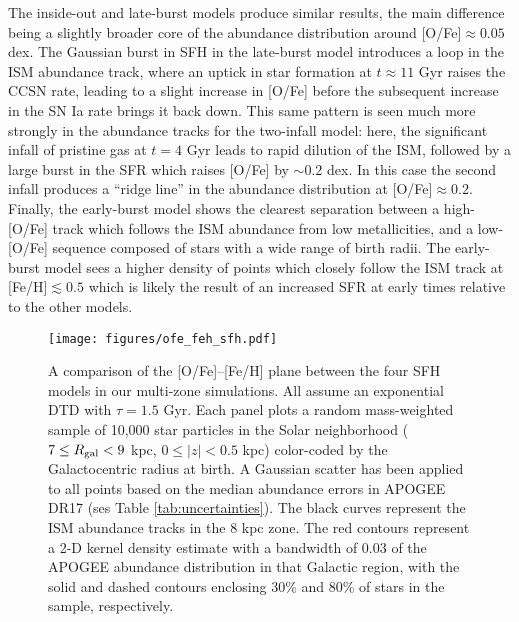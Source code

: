\documentclass[modern,linenumbers]{aastex631}
\begin{document}
The inside-out and late-burst models produce similar results, the main difference being a slightly broader core of the abundance distribution around [O/Fe]$\approx0.05$ dex. The Gaussian burst in SFH in the late-burst model introduces a loop in the ISM abundance track, where an uptick in star formation at $t\approx11$ Gyr raises the CCSN rate, leading to a slight increase in [O/Fe] before the subsequent increase in the SN Ia rate brings it back down. This same pattern is seen much more strongly in the abundance tracks for the two-infall model: here, the significant infall of pristine gas at $t=4$ Gyr leads to rapid dilution of the ISM, followed by a large burst in the SFR which raises [O/Fe] by $\sim 0.2$ dex. In this case the second infall produces a ``ridge line'' in the abundance distribution at [O/Fe]$\approx 0.2$. Finally, the early-burst model shows the clearest separation between a high-[O/Fe] track which follows the ISM abundance from low metallicities, and a low-[O/Fe] sequence composed of stars with a wide range of birth radii. The early-burst model sees a higher density of points which closely follow the ISM track at [Fe/H]$\lesssim 0.5$ which is likely the result of an increased SFR at early times relative to the other models.

\begin{figure}
    \centering
    \texttt{[image: figures/ofe\_feh\_sfh.pdf]}
    \caption{A comparison of the [O/Fe]--[Fe/H] plane between the four SFH models in our multi-zone simulations. All assume an exponential DTD with $\tau=1.5$ Gyr. Each panel plots a random mass-weighted sample of 10,000 star particles in the Solar neighborhood ($7\leq R_{\rm gal}<9$ kpc, $0\leq|z|<0.5$ kpc) color-coded by the Galactocentric radius at birth. A Gaussian scatter has been applied to all points based on the median abundance errors in APOGEE DR17 (ses Table \ref{tab:uncertainties}). The black curves represent the ISM abundance tracks in the 8 kpc zone. The red contours represent a 2-D kernel density estimate with a bandwidth of 0.03 of the APOGEE abundance distribution in that Galactic region, with the solid and dashed contours enclosing 30\% and 80\% of stars in the sample, respectively.}
    \label{fig:ofe-feh-sfh}
\end{figure}
\end{document}
